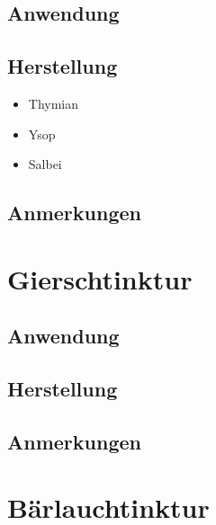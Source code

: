  

\subsection{Anwendung}

\subsection{Herstellung}

\begin{itemize}
	\item Thymian
	\item Ysop
	\item Salbei
\end{itemize}

\subsection{Anmerkungen}







\section{Gierschtinktur}

    

\subsection{Anwendung}

\subsection{Herstellung}

\subsection{Anmerkungen}







\section{Bärlauchtinktur}


